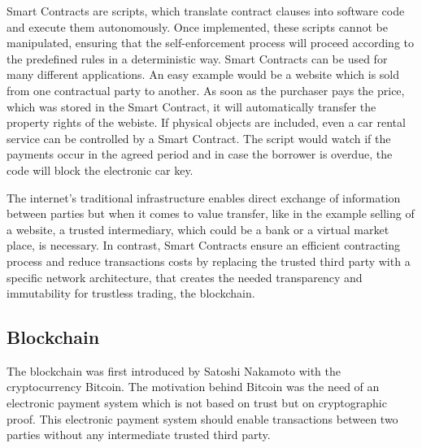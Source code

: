 \documentclass[conference]{IEEEtran}
\begin{document}
Smart Contracts are scripts, which translate contract clauses into software code and execute them autonomously. Once implemented, these scripts cannot be manipulated, ensuring that the self-enforcement process will proceed according to the predefined rules in a deterministic way.   
Smart Contracts can be used for many different applications. An easy example would be a website which is sold from one contractual party to another. As soon as the purchaser pays the price, which was stored in the Smart Contract, it will automatically transfer the property rights of the webiste. If physical objects are included, even a car rental service can be controlled by a Smart Contract. The script would watch if the payments occur in the agreed period and in case the borrower is overdue, the code will block the electronic car key. \cite{Meitinger2017} \cite{Spancken2016} \cite{Jung2017} \cite{Lee2016}\par 
The internet's traditional infrastructure enables direct exchange of information between parties but when it comes to value transfer, like in the example selling of a website, a trusted intermediary, which could be a bank or a virtual market place, is necessary. In contrast, Smart Contracts ensure an efficient contracting process and reduce transactions costs by replacing the trusted third party with a specific network architecture, that creates the needed transparency and immutability for trustless trading, the blockchain. \cite{Meitinger2017}
\subsection{Blockchain}
The blockchain was first introduced by Satoshi Nakamoto with the cryptocurrency Bitcoin. The motivation behind Bitcoin was the need of an electronic payment system which is not based on trust but on cryptographic proof. This electronic payment system should enable transactions between two parties without any intermediate trusted third party.\cite{Nakamoto2008}
\end{document}
